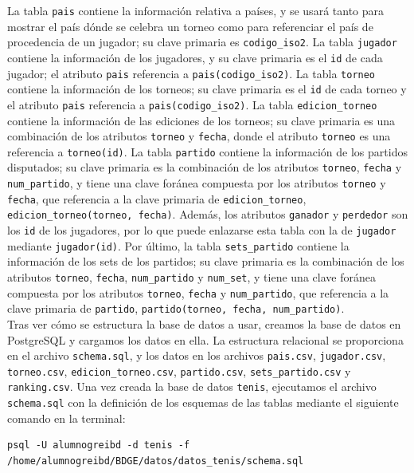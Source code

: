 \documentclass[11pt]{opticajnl}
\begin{document}
La tabla \texttt{pais} contiene la información relativa a países, y se usará tanto para mostrar el país dónde se celebra un torneo como para referenciar el país de procedencia de un jugador; su clave primaria es \texttt{codigo\_iso2}. La tabla \texttt{jugador} contiene la información de los jugadores, y su clave primaria es el \texttt{id} de cada jugador; el atributo \texttt{pais} referencia a \texttt{pais(codigo\_iso2)}. La tabla \texttt{torneo} contiene la información de los torneos; su clave primaria es el \texttt{id} de cada torneo y el atributo \texttt{pais} referencia a \texttt{pais(codigo\_iso2)}. La tabla \texttt{edicion\_torneo} contiene la información de las ediciones de los torneos; su clave primaria es una combinación de los atributos \texttt{torneo} y \texttt{fecha}, donde el atributo \texttt{torneo} es una referencia a \texttt{torneo(id)}. La tabla \texttt{partido} contiene la información de los partidos disputados; su clave primaria es la combinación de los atributos \texttt{torneo}, \texttt{fecha} y \texttt{num\_partido}, y tiene una clave foránea compuesta por los atributos \texttt{torneo} y \texttt{fecha}, que referencia a la clave primaria de \texttt{edicion\_torneo}, \texttt{edicion\_torneo(torneo, fecha)}. Además, los atributos \texttt{ganador} y \texttt{perdedor} son los \texttt{id} de los jugadores, por lo que puede enlazarse esta tabla con la de \texttt{jugador} mediante \texttt{jugador(id)}. Por último, la tabla \texttt{sets\_partido} contiene la información de los sets de los partidos; su clave primaria es la combinación de los atributos \texttt{torneo}, \texttt{fecha}, \texttt{num\_partido} y \texttt{num\_set}, y tiene una clave foránea compuesta por los atributos \texttt{torneo}, \texttt{fecha} y \texttt{num\_partido}, que referencia a la clave primaria de \texttt{partido}, \texttt{partido(torneo, fecha, num\_partido)}. \\

Tras ver cómo se estructura la base de datos a usar, creamos la base de datos en PostgreSQL y cargamos los datos en ella. La estructura relacional se proporciona en el archivo \texttt{schema.sql}, y los datos en los archivos \texttt{pais.csv}, \texttt{jugador.csv}, \texttt{torneo.csv}, \texttt{edicion\_torneo.csv}, \texttt{partido.csv}, \texttt{sets\_partido.csv} y \texttt{ranking.csv}. Una vez creada la base de datos \texttt{tenis}, ejecutamos el archivo \texttt{schema.sql} con la definición de los esquemas de las tablas mediante el siguiente comando en la terminal:

\begin{lstlisting}[style=terminal]
psql -U alumnogreibd -d tenis -f /home/alumnogreibd/BDGE/datos/datos_tenis/schema.sql
\end{lstlisting}
\end{document}

